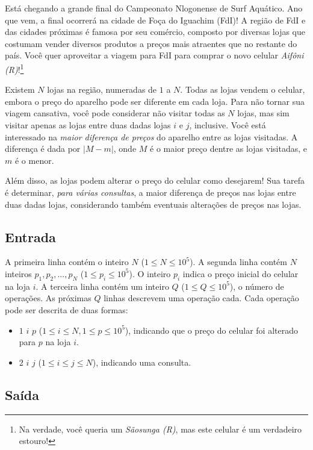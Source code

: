 Está chegando a grande final do Campeonato Nlogonense de Surf Aquático.
Ano que vem, a final ocorrerá na cidade de Foça do Iguachim (FdI)!
A região de FdI e das cidades próximas é famosa por seu comércio, composto por diversas lojas
que costumam vender diversos produtos a preços mais atraentes que no restante do
país. Você quer aproveitar a viagem para FdI para comprar o novo celular
\textit{Aifôni (R)}!\footnote{Na verdade, você queria um \textit{Sãosunga (R)},
mas este celular é um verdadeiro estouro!}

Existem $N$ lojas na região, numeradas de $1$ a $N$. Todas as lojas vendem o
celular, embora o preço do aparelho pode ser diferente em cada loja. Para não
tornar sua viagem cansativa, você pode considerar não visitar todas as $N$
lojas, mas sim visitar apenas as lojas entre duas dadas lojas $i$ e $j$, inclusive.
Você está interessado na \textit{maior diferença de preços} do aparelho entre as
lojas visitadas. A diferença é dada por $|M - m|$, onde $M$ é o maior preço
dentre as lojas visitadas, e $m$ é o menor.

Além disso, as lojas podem alterar o preço do celular como desejarem! Sua tarefa
é determinar, \textit{para várias consultas}, a maior diferença de preços nas
lojas entre duas dadas lojas, considerando também eventuais alterações de preços nas lojas.

\subsection*{Entrada}

A primeira linha contém o inteiro $N$ ($1 \leq N \leq 10^5$). A segunda linha
contém $N$ inteiros $p_1, p_2, ..., p_N$ ($1 \leq p_i \leq 10^5$). O inteiro
$p_i$ indica o preço inicial do celular na loja $i$.
A terceira linha contém um inteiro $Q$ ($1 \leq Q \leq 10^5$), o número de
operações. As próximas $Q$ linhas descrevem uma operação cada. Cada operação
pode ser descrita de duas formas:

\begin{itemize}
    \item $1$ $i$ $p$ ($1 \leq i \leq N, 1 \leq p \leq 10^5$),
    indicando que o preço do celular foi alterado para $p$ na loja $i$.
    \item $2$ $i$ $j$ ($1 \leq i \leq j \leq N$), indicando uma consulta.
\end{itemize}

\subsection*{Saída}

